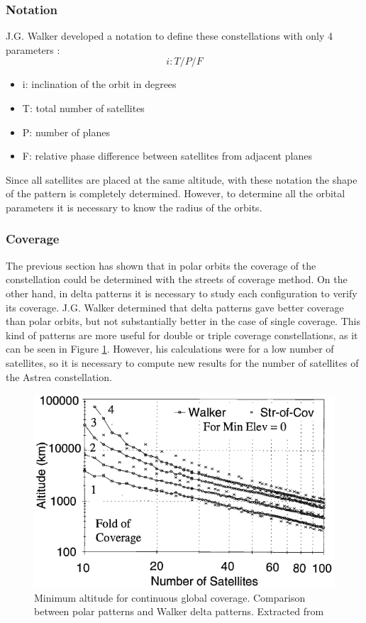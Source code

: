 \subsubsection{Notation}
\label{FullNotation}
J.G. Walker developed a notation to define these constellations with only 4 parameters \cite{Walker1977}:
\begin{equation*}
i: T/P/F
\end{equation*}
\begin{itemize}
\item i: inclination of the orbit in degrees
\item T: total number of satellites
\item P: number of planes
\item F: relative phase difference between satellites from adjacent planes
\end{itemize}
Since all satellites are placed at the same altitude, with these notation the shape of the pattern is completely determined. However, to determine all the orbital parameters it is necessary to know the radius of the orbits.

\subsubsection{Coverage}
\label{FullCoverage}
The previous section has shown that in polar orbits the coverage of the constellation could be determined with the streets of coverage method. On the other hand, in delta patterns it is necessary to study each configuration to verify its coverage. J.G. Walker determined that delta patterns gave better coverage than polar orbits, but not substantially better in the case of single coverage. This kind of patterns are more useful for double or triple coverage constellations, as it can be seen in Figure \ref{fig:Walker vs. polar}. However, his calculations were for a low number of satellites, so it is necessary to compute new results for the number of satellites of the Astrea constellation.
\begin{figure}[h]
\centerline{\includegraphics[scale=0.75]{foldofcoverage.png}}
\caption{Minimum altitude for continuous global coverage. Comparison between polar patterns and Walker delta patterns. Extracted from \cite{Chobotov2002}}
\label{fig:Walker vs. polar}
\end{figure}